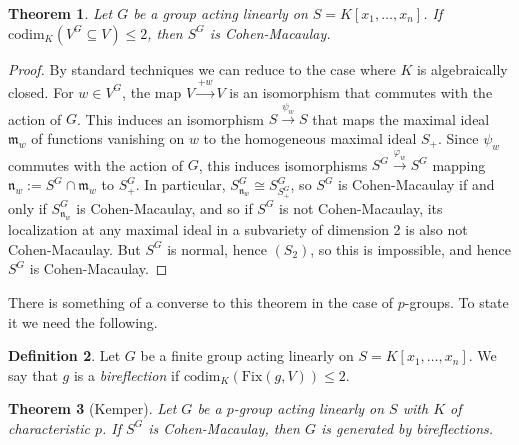 \documentclass[12pt]{amsart}
\newtheorem{theorem}{Theorem}[section]
\theoremstyle{definition}
\newtheorem{definition}[theorem]{Definition}
\numberwithin{equation}{theorem}
\def\phi{\varphi}
\begin{document}
\begin{theorem}
Let $G$ be a group acting linearly on $S=K[x_1,\dots,x_n]$. If $\mathrm{codim}_K(V^G \subseteq V) \leq 2$, then $S^G$ is Cohen-Macaulay.
\end{theorem}
\begin{proof} By standard techniques we can reduce to the case where $K$ is algebraically closed.
For $w\in V^G$, the map $V\xrightarrow{+w} V$ is an isomorphism that commutes with the action of $G$. This induces an isomorphism $S \xrightarrow{\psi_w} S$ that maps the maximal ideal $\mathfrak{m}_w$ of functions vanishing on $w$ to the homogeneous maximal ideal $S_+$. Since $\psi_w$ commutes with the action of $G$, this induces isomorphisms $S^G \xrightarrow{\phi_w} S^G$ mapping $\mathfrak{n}_w := S^G \cap \mathfrak{m}_w$ to $S^G_+$. In particular, $S^G_{\mathfrak{n}_w} \cong S^G_{S^G_+}$, so $S^G$ is Cohen-Macaulay if and only if $S^G_{\mathfrak{n}_w}$ is Cohen-Macaulay, and so if $S^G$ is not Cohen-Macaulay, its localization at any maximal ideal in a subvariety of dimension 2 is also not Cohen-Macaulay. But $S^G$ is normal, hence $(S_2)$, so this is impossible, and hence $S^G$ is Cohen-Macaulay.
\end{proof}

There is something of a converse to this theorem in the case of $p$-groups. To state it we need the following.

\begin{definition}
Let $G$ be a finite group acting linearly on $S=K[x_1,\dots,x_n]$. We say that $g$ is a \emph{bireflection} if $\mathrm{codim}_K( \mathrm{Fix}(g,V) ) \leq 2$.
\end{definition}

\begin{theorem}[Kemper] Let $G$ be a $p$-group acting linearly on $S$ with $K$ of characteristic $p$. If $S^G$ is Cohen-Macaulay, then $G$ is generated by bireflections.
\end{theorem}
\end{document}
